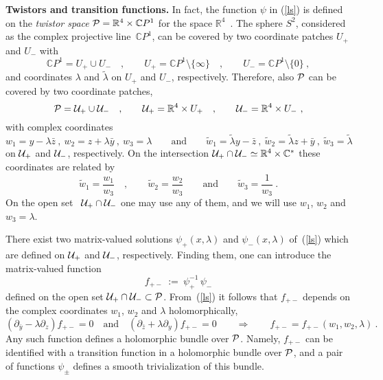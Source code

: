 \documentclass[a4paper,11pt]{article}
\numberwithin{equation}{section}
\def\l{\lambda}
\newcommand{\C}{\mathbb C}
\newcommand{\R}{\mathbb R}
\newcommand{\Pcal}{{\cal P}}
\newcommand{\U}{{\cal U}}
\def\pa{\mbox{$\partial$}}
\begin{document}
\noindent
{\bf Twistors and transition functions.} 
In fact, the function $\psi$ in (\ref{ls}) is defined 
on the {\it twistor space\/} $\Pcal =\R^4\times\C P^1$ for 
the space $\R^4$~\cite{Atiyah:1977pw,Atiyah:1978wi}. The sphere 
$S^2$, considered as the complex projective
line~$\C P^1$, can be covered by two coordinate patches $U_+$ and $U_-$ with
\begin{equation}
\C P^1=U_+\cup  U_-\quad ,\qquad 
U_+=\C P^1\setminus\{\infty\}\quad ,\qquad
U_-=\C P^1\setminus\{0\}\ ,
\end{equation}
and coordinates $\l$ and $\tilde\l$ on $U_+$ and $U_-$, respectively.
Therefore, also $\Pcal$ can be covered by two coordinate patches,
\begin{equation}
\Pcal =\U_+\cup\U_-\quad ,\qquad 
\U_+=\R^4\times U_+\quad ,\qquad 
\U_-=\R^4\times U_-\ ,
\end{equation}
with complex coordinates
\begin{equation}
w_1=y-\l\bar z\ ,\ w_2=z+\l \bar y\ ,\ w_3=\l\qquad\mbox{and}\qquad
\tilde w_1=\tilde \l y-\bar z\ ,\ \tilde w_2=\tilde \l z+\bar y\ ,\ 
\tilde w_3=\tilde \l
\end{equation}
on $\U_+$ and $\U_-$, respectively. On the intersection
$\U_+\cap\U_-\simeq\R^4\times\C^*$ these coordinates are related by
\begin{equation}
\tilde w_1=\frac{w_1}{w_3}\quad ,\qquad \tilde w_2=\frac{w_2}{w_3}
\qquad\mbox{and}\qquad \tilde w_3=\frac{1}{w_3}\ .
\end{equation}
On the open set ~$\U_+\cap\U_-$ one may use any of them, and we will 
use $w_1$, $w_2$ and $w_3{=}\l$.

There exist two matrix-valued solutions $\psi_+(x,\l )$ and 
$\psi_-(x,\l )$ of~(\ref{ls}) which are defined on 
$\U_+$ and $\U_-$, respectively. Finding them, one can introduce the 
matrix-valued function
\begin{equation}\label{triv}
{}f_{+-}\ :=\ \psi_+^{-1}\,\psi_-
\end{equation}
defined on the open set $\U_+\cap\U_-\subset \Pcal$. From~(\ref{ls}) it 
follows that $f_{+-}$ depends on the complex coordinates 
$w_1$, $w_2$ and $\l$ holomorphically, 
\begin{equation}
(\pa_{\bar y}-\l\pa_z)f_{+-}=0 \quad\textrm{and}\quad
(\pa_{\bar z}+\l\pa_y)f_{+-}=0 \qquad \Longrightarrow \qquad
f_{+-}=f_{+-}(w_1,w_2,\l)\ .
\end{equation}
Any such function defines a holomorphic bundle over $\Pcal$. Namely, $f_{+-}$ 
can be identified with a transition function in a holomorphic bundle over 
$\Pcal$, and a pair of functions $\psi_{\pm}$
defines a smooth trivialization of this bundle.
\end{document}

